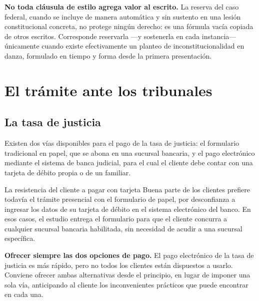 \documentclass[12pt,oneside]{book}
\begin{document}
\begin{important}
\textbf{No toda cláusula de estilo agrega valor al escrito.} La reserva del caso federal, cuando se incluye de manera automática y sin sustento en una lesión constitucional concreta, no protege ningún derecho: es una fórmula vacía copiada de otros escritos. Corresponde reservarla —y sostenerla en cada instancia— únicamente cuando existe efectivamente un planteo de inconstitucionalidad en danza, formulado en tiempo y forma desde la primera presentación.
\end{important}

\chapter{El trámite ante los tribunales}

\section{La tasa de justicia}

Existen dos vías disponibles para el pago de la tasa de justicia: el formulario tradicional en papel, que se abona en una sucursal bancaria, y el pago electrónico mediante el sistema de banca judicial, para el cual el cliente debe contar con una tarjeta de débito propia o de un familiar.

\begin{example}{La resistencia del cliente a pagar con tarjeta}
Buena parte de los clientes prefiere todavía el trámite presencial con el formulario de papel, por desconfianza a ingresar los datos de su tarjeta de débito en el sistema electrónico del banco. En esos casos, el estudio entrega el formulario para que el cliente concurra a cualquier sucursal bancaria habilitada, sin necesidad de acudir a una sucursal específica.
\end{example}

\begin{important}
\textbf{Ofrecer siempre las dos opciones de pago.} El pago electrónico de la tasa de justicia es más rápido, pero no todos los clientes están dispuestos a usarlo. Conviene ofrecer ambas alternativas desde el principio, en lugar de imponer una sola vía, anticipando al cliente los inconvenientes prácticos que puede encontrar en cada una.
\end{important}
\end{document}
